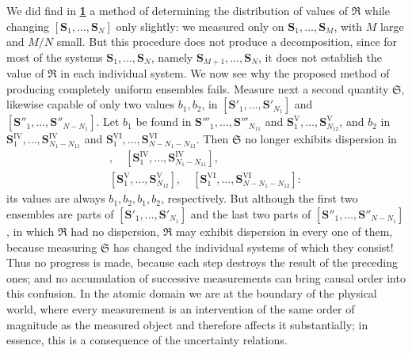 \documentclass[fontsize=13pt,twoside,openany,headings=normal,parskip=false,bookmarkpackage=false,DIV=calc]{scrbook}
\begin{document}
We did find in \hyperref[advantage:IV.1.1]{\textbf{1}} a method of determining the distribution of values of $\mathfrak R$ while changing $[\boldsymbol{S}_1,\ldots,\boldsymbol{S}_N]$ only slightly: we measured only on $\boldsymbol{S}_1,\ldots,\boldsymbol{S}_M$, with $M$ large and $M/N$ small. But this procedure does not produce a decomposition, since for most of the systems $\boldsymbol{S}_1,\ldots,\boldsymbol{S}_N$, namely $\boldsymbol{S}_{M+1},\ldots,\boldsymbol{S}_N$, it does not establish the value of $\mathfrak R$ in each individual system. We now see why the proposed method of producing completely uniform ensembles fails. Measure next a second quantity $\mathfrak S$, likewise capable of only two values $b_1,b_2$, in $[\boldsymbol{S}'_1,\ldots,\boldsymbol{S}'_{N_1}]$ and $[\boldsymbol{S}''_1,\ldots,\boldsymbol{S}''_{N-N_1}]$. Let $b_1$ be found in $\boldsymbol{S}'''_1,\ldots,\boldsymbol{S}'''_{N_{11}}$ and $\boldsymbol{S}^{\mathrm V}_1,\ldots,\boldsymbol{S}^{\mathrm V}_{N_{12}}$, and $b_2$ in $\boldsymbol{S}^{\mathrm{IV}}_1,\ldots,\boldsymbol{S}^{\mathrm{IV}}_{N_1-N_{11}}$ and $\boldsymbol{S}^{\mathrm{VI}}_1,\ldots,\boldsymbol{S}^{\mathrm{VI}}_{N-N_1-N_{12}}$. Then $\mathfrak S$ no longer exhibits dispersion in
\begin{gather*}
[\boldsymbol{S}'''_1,\ldots,\boldsymbol{S}'''_{N_{11}}],\quad
[\boldsymbol{S}^{\mathrm{IV}}_1,\ldots,\boldsymbol{S}^{\mathrm{IV}}_{N_1-N_{11}}],\\
[\boldsymbol{S}^{\mathrm V}_1,\ldots,\boldsymbol{S}^{\mathrm V}_{N_{12}}],\quad
[\boldsymbol{S}^{\mathrm{VI}}_1,\ldots,\boldsymbol{S}^{\mathrm{VI}}_{N-N_1-N_{12}}]:
\end{gather*}
its values are always $b_1,b_2,b_1,b_2$, respectively. But although the first two ensembles are parts of $[\boldsymbol{S}'_1,\ldots,\boldsymbol{S}'_{N_1}]$ and the last two parts of $[\boldsymbol{S}''_1,\ldots,\boldsymbol{S}''_{N-N_1}]$, in which $\mathfrak R$ had no dispersion, $\mathfrak R$ may exhibit dispersion in every one of them, because measuring $\mathfrak S$ has changed the individual systems of which they consist! Thus no progress is made, because each step destroys the result of the preceding ones; and no accumulation of successive
\hypertarget{origpage-162}{}%
measurements can bring causal order into this confusion. In the atomic domain we are at the boundary of the physical world, where every measurement is an intervention of the same order of magnitude as the measured object and therefore affects it substantially; in essence, this is a consequence of the uncertainty relations.
\end{document}
